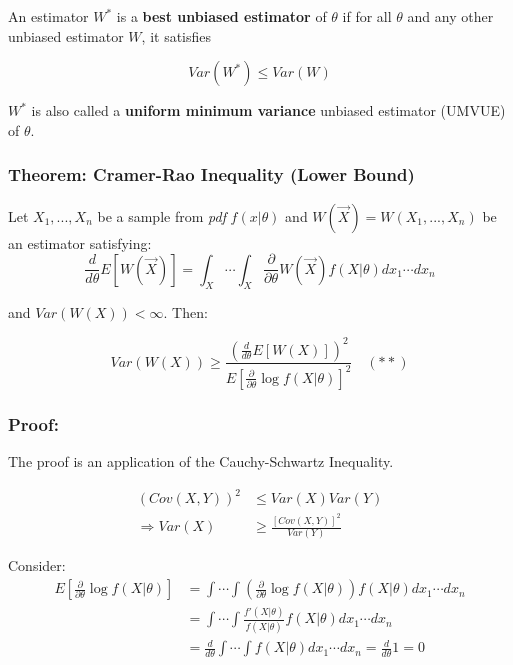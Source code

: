 \documentclass{article}
\begin{document}
An estimator $W^*$ is a \textbf{best unbiased estimator} of $\theta$ if for all $\theta$ and any other unbiased estimator $W$, it satisfies

\begin{equation*}
    Var(W^*) \leq Var(W)
\end{equation*}

$W^*$ is also called a \textbf{uniform minimum variance} unbiased estimator (UMVUE) of $\theta$.

\subsubsection{Theorem: Cramer-Rao Inequality (Lower Bound)}

Let $X_1,...,X_n$ be a sample from \textit{pdf} $f(x|\theta)$ and $W(\vec{X}) = W(X_1,...,X_n)$ be an estimator satisfying:
\begin{equation*}
    \frac{d}{d\theta} E\left[W(\vec{X})\right] = \int_X \cdots \int_X \frac{\partial}{\partial \theta}W(\vec{X}) f(X|\theta) dx_1\cdots dx_n
\end{equation*}

and $Var(W(X)) < \infty$. Then:

\begin{equation*}
    Var(W(X)) \geq \frac{\left(\frac{d}{d\theta} E[W(X)] \right)^2}{E\left[ \frac{\partial}{\partial\theta} \log f(X|\theta) \right]^2}    \quad (**)
\end{equation*}

\subsubsection*{Proof:}

The proof is an application of the Cauchy-Schwartz Inequality.

\begin{equation*}
    \begin{split}
        \left(Cov(X,Y) \right)^2 &\leq Var(X) Var(Y)\\
        \Rightarrow Var(X) &\geq \frac{[Cov(X,Y)]^2}{Var(Y)}
    \end{split}
\end{equation*}

Consider:
\begin{equation*}
    \begin{split}
        E\left[\frac{\partial}{\partial \theta} \log f(X|\theta) \right] &= \int \cdots \int \left( \frac{\partial}{\partial \theta} \log f(X|\theta)\right) f(X|\theta) dx_1\cdots dx_n\\
        &= \int \cdots \int \frac{f'(X|\theta)}{f(X|\theta)} f(X|\theta) dx_1\cdots dx_n\\
        &= \frac{d}{d\theta} \int \cdots \int f(X|\theta) dx_1\cdots dx_n = \frac{d}{d\theta} 1 = 0
    \end{split}
\end{equation*}
\end{document}
